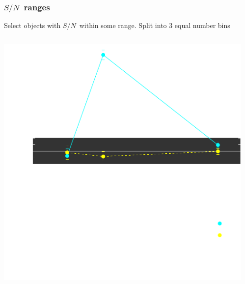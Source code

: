 \documentclass{beamer}
\newcommand{\snr}{$S/N$}
\begin{document}
{\begin{columns}
\begin{column}{0.5\textwidth}
\begin{center}
                \newline
            \end{center}
        \end{column}
    \end{columns}


}

\frame
{
    \frametitle{\snr\ ranges}
 
    Select objects with \snr\ within some range.  Split into 3 equal number bins

    \begin{columns}
        \begin{column}{0.5\textwidth}    

            \begin{center}
                \includegraphics[width=\textwidth]{m-select-bias-range-inv.pdf}
                \newline
            \end{center}
        \end{column}
        \begin{column}{0.5\textwidth}
            \begin{center}

\end{center}
\end{column}
\end{columns}}
\end{document}
